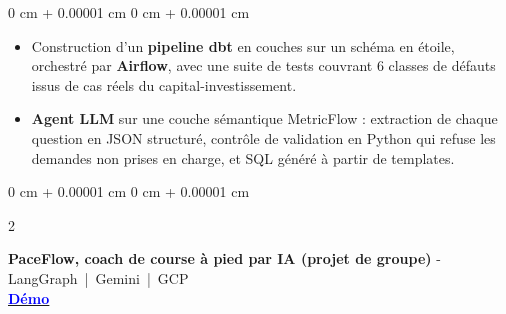 \documentclass[10pt, letterpaper]{article}
\newenvironment{highlights}{
    \begin{itemize}[
        topsep=0.04 cm,
        parsep=0.02cm,
        partopsep=0pt,
        itemsep=0pt,
        leftmargin=0 cm + 10pt
    ]
}{
    \end{itemize}
} %
\newcommand{\stronglink}[2]{%
    \href{#1}{\textbf{\uline{\textcolor{blue}{#2}}}}%
}
\newenvironment{onecolentry}{
    \begin{adjustwidth}{
        0 cm + 0.00001 cm
    }{
        0 cm + 0.00001 cm
    }
}{
    \end{adjustwidth}
} %
\newenvironment{twocolentry}[2][]{
    \onecolentry
    \def\secondColumn{#2}
    \setcolumnwidth{\fill, 3.8 cm}
    \begin{paracol}{2}
}{
    \switchcolumn \raggedleft \secondColumn
    \end{paracol}
    \endonecolentry
} %
\begin{document}
    \begin{onecolentry}
        \begin{highlights}
            \item Construction d'un \textbf{pipeline dbt} en couches sur un schéma en étoile, orchestré par \textbf{Airflow}, avec une suite de tests couvrant 6 classes de défauts issus de cas réels du capital-investissement.
            \item \textbf{Agent LLM} sur une couche sémantique MetricFlow : extraction de chaque question en JSON structuré, contrôle de validation en Python qui refuse les demandes non prises en charge, et SQL généré à partir de templates.
        \end{highlights}
    \end{onecolentry}

        \vspace{0.20cm}

        \begin{twocolentry}{
        \stronglink{https://www.youtube.com/watch?v=iKtOmG7dsHc}{Démo}
    }
        \textbf{PaceFlow, coach de course à pied par IA (projet de groupe)} -
        LangGraph \,|\, Gemini \,|\, GCP \\
        \end{twocolentry}
\end{document}
